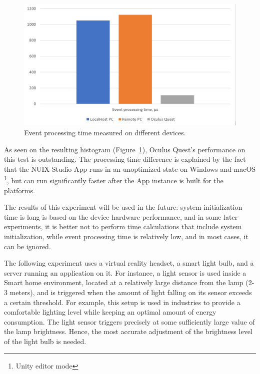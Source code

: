 \begin{figure}
  \centering
  \includegraphics[width = 0.9 \linewidth]{figures/EventProcessingTime.png}
  \caption{Event processing time measured on different devices.}
  \label{fig:EventProcessingTime-figure}
\end{figure}

As seen on the resulting histogram (Figure~\ref{fig:EventProcessingTime-figure}), Oculus Quest's performance on this test is outstanding. The processing time difference is explained by the fact that the NUIX-Studio App runs in an unoptimized state on Windows and macOS \footnote{Unity editor mode}, but can run significantly faster after the App instance is built for the platforms.

The results of this experiment will be used in the future: system initialization time is long is based on the device hardware performance, and in some later experiments, it is better not to perform time calculations that include system initialization, while event processing time is relatively low, and in most cases, it can be ignored.

The following experiment uses a virtual reality headset, a smart light bulb, and a server running an application on it. For instance, a light sensor is used inside a Smart home environment, located at a relatively large distance from the lamp (2-3 meters), and is triggered when the amount of light falling on its sensor exceeds a certain threshold. For example, this setup is used in industries to provide a comfortable lighting level while keeping an optimal amount of energy consumption. The light sensor triggers precisely at some sufficiently large value of the lamp brightness. Hence, the most accurate adjustment of the brightness level of the light bulb is needed.

